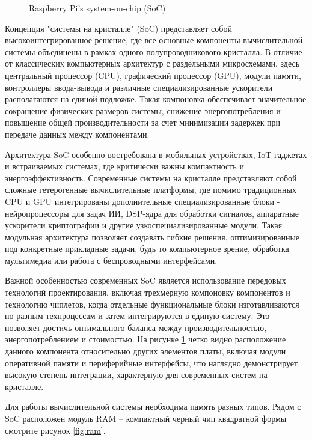 \begin{figure}[H]
	\centering
	\caption{Raspberry Pi’s system-on-chip (SoC)}
	\label{fig:soc}
\end{figure}

Концепция "системы на кристалле" (SoC) представляет собой высокоинтегрированное решение, где все основные компоненты вычислительной системы объединены в рамках одного полупроводникового кристалла. В отличие от классических компьютерных архитектур с раздельными микросхемами, здесь центральный процессор (CPU), графический процессор (GPU), модули памяти, контроллеры ввода-вывода и различные специализированные ускорители располагаются на единой подложке. Такая компоновка обеспечивает значительное сокращение физических размеров системы, снижение энергопотребления и повышение общей производительности за счет минимизации задержек при передаче данных между компонентами.

Архитектура SoC особенно востребована в мобильных устройствах, IoT-гаджетах и встраиваемых системах, где критически важны компактность и энергоэффективность. Современные системы на кристалле представляют собой сложные гетерогенные вычислительные платформы, где помимо традиционных CPU и GPU интегрированы дополнительные специализированные блоки - нейропроцессоры для задач ИИ, DSP-ядра для обработки сигналов, аппаратные ускорители криптографии и другие узкоспециализированные модули. Такая модульная архитектура позволяет создавать гибкие решения, оптимизированные под конкретные прикладные задачи, будь то компьютерное зрение, обработка мультимедиа или работа с беспроводными интерфейсами.

Важной особенностью современных SoC является использование передовых технологий проектирования, включая трехмерную компоновку компонентов и технологию чиплетов, когда отдельные функциональные блоки изготавливаются по разным техпроцессам и затем интегрируются в единую систему. Это позволяет достичь оптимального баланса между производительностью, энергопотреблением и стоимостью. На рисунке \ref{fig:soc} четко видно расположение данного компонента относительно других элементов платы, включая модули оперативной памяти и периферийные интерфейсы, что наглядно демонстрирует высокую степень интеграции, характерную для современных систем на кристалле.

Для работы вычислительной системы необходима память разных типов. Рядом с SoC расположен модуль RAM -- компактный черный чип квадратной формы смотрите рисунок \ref{fig:ram}.

